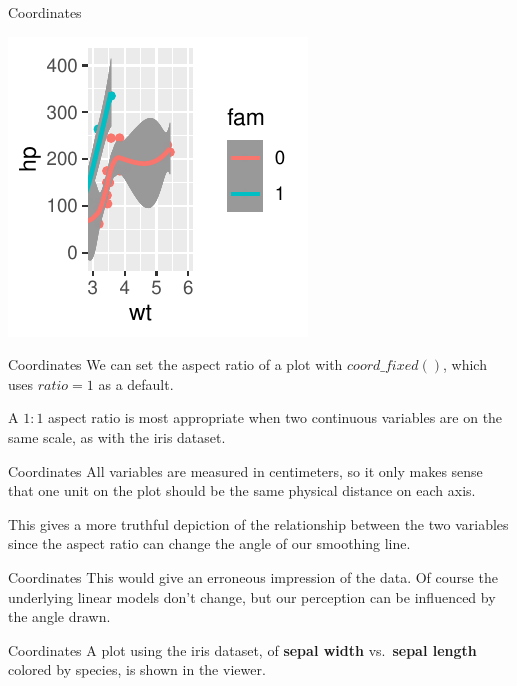 \documentclass[
  ignorenonframetext,
]{beamer}
\begin{document}
\begin{frame}[fragile]{Coordinates}
\begin{center}\includegraphics[width=0.5\linewidth]{Figs/unnamed-chunk-40-1} \end{center}
\end{frame}

\begin{frame}{Coordinates}
\label{coordinates-9}
We can set the aspect ratio of a plot with \(coord\_fixed()\), which
uses \(ratio = 1\) as a default.

A \(1:1\) aspect ratio is most appropriate when two continuous variables
are on the same scale, as with the iris dataset.
\end{frame}

\begin{frame}{Coordinates}
\label{coordinates-10}
All variables are measured in centimeters, so it only makes sense that
one unit on the plot should be the same physical distance on each axis.

This gives a more truthful depiction of the relationship between the two
variables since the aspect ratio can change the angle of our smoothing
line.
\end{frame}

\begin{frame}{Coordinates}
\label{coordinates-11}
This would give an erroneous impression of the data. Of course the
underlying linear models don't change, but our perception can be
influenced by the angle drawn.
\end{frame}

\begin{frame}{Coordinates}
\label{coordinates-12}
A plot using the iris dataset, of \textbf{sepal width} vs.~\textbf{sepal
length} colored by species, is shown in the viewer.
\end{frame}
\end{document}
